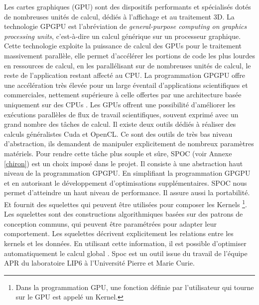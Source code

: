 Les cartes graphiques (GPU) sont des dispositifs performants et spécialisés dotés de nombreuses unités de calcul, dédiés à l'affichage et au traitement 3D. La technologie GPGPU est l'abréviation de \textit{general-purpose computing on graphics processing units}, c'est-à-dire un calcul générique sur un processeur graphique. Cette technologie exploite la puissance de calcul des GPUs pour le traitement massivement parallèle, elle permet d'accélérer les portions de code les plus lourdes en ressources de calcul, en les parallélisant sur de nombreuses unités de calcul, le reste de l'application restant affecté au CPU. La programmation GPGPU offre une accélération très élevée pour un large éventail d'applications scientifiques et commerciales, nettement supérieure à celle offertes par une architecture basée uniquement sur des CPUs \cite{nv}.
Les GPUs offrent une possibilité d'améliorer les exécutions parallèles de flux de travail scientifiques, souvent exprimé avec un grand nombre des tâches de calcul.  %
Il existe deux outils dédiés à réaliser des calculs généralistes Cuda et OpenCL. Ce sont des outils de très bas niveau d'abstraction, ils demandent de manipuler explicitement de nombreux paramètres matériels. Pour rendre cette t\^ache plus souple et s\^ure, SPOC (voir Annexe \ref{chiron}) est un choix imposé dans le projet. Il consiste à une abstraction haut niveau de la programmation GPGPU. En simplifiant la programmation GPGPU et en autorisant le développement d'optimisations supplémentaires. SPOC nous permet d'atteindre un haut niveau de performance. Il assure aussi la portabilité. Et fournit des squelettes qui peuvent être utilisées pour composer les Kernels \footnote{ Dans la programmation GPU, une fonction définie par l'utilisateur qui tourne sur le GPU est appelé un Kernel.}. Les squelettes sont des constructions algorithmiques basées sur des patrons de conception communs, qui peuvent être paramétrées pour adapter leur comportement. Les squelettes décrivent explicitement les relations entre les kernels et les données. En utilisant cette information, il est possible d'optimiser automatiquement le calcul global \cite{bour14}. Spoc est un outil issue du travail de l'équipe APR du laboratoire LIP6 à l'Université Pierre et Marie Curie. 





